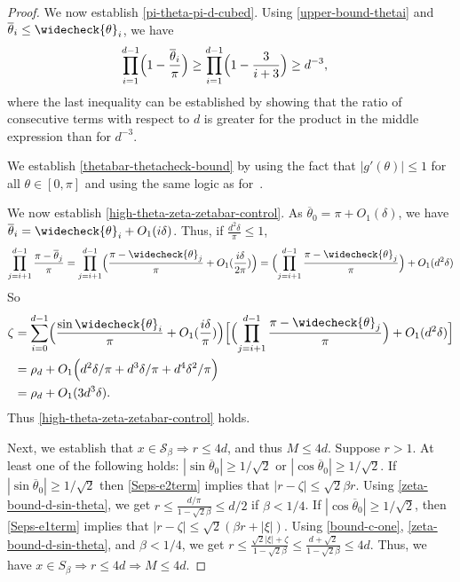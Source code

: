 \documentclass[11pt]{article}
\newcommand{\thetabar}{\overline{\theta}}
\newcommand{\thetacheck}{\widecheck{\theta}}
\newcommand{\zetacheck}{\rho}
\newcommand\setS{\mathcal S}
\begin{document}
\begin{proof}
We now establish \eqref{pi-theta-pi-d-cubed}.  Using \eqref{upper-bound-thetai} and $\thetabar_i \leq \thetacheck_i$, we have
\begin{align*}
\prod_{i=1}^{d-1} \Bigl(1 - \frac{\thetabar_i}{\pi} \Bigr) &\geq \prod_{i=1}^{d-1} \Bigl(1 - \frac{3}{i+3}  \Bigr)
\geq d^{-3},
\end{align*}
where the last inequality can be established by showing that the ratio of consecutive terms with respect to $d$ is greater for the product in the middle expression than for $d^{-3}$.

We establish \eqref{thetabar-thetacheck-bound} by using the fact that $|g'(\theta)| \leq 1$ for all $\theta \in [0, \pi]$ and using the same logic as for~\cite[Eq.~17]{hand_global_2017}.

We now establish \eqref{high-theta-zeta-zetabar-control}.  As $\thetabar_0 = \pi + O_1(\delta)$, we have $\thetabar_i = \thetacheck_i + O_1(i \delta)$.  Thus, if $\frac{d^2 \delta}{\pi}\leq 1$,
\[
\prod_{j=i+1}^{d-1} \frac{\pi - \thetabar_j}{\pi} = \prod_{j=i+1}^{d-1} \Bigl( \frac{\pi - \thetacheck_j}{\pi} + O_1(\frac{i \delta}{2 \pi} ) \Bigr) = \Bigl(\prod_{j=i+1}^{d-1}  \frac{\pi - \thetacheck_j}{\pi} \Bigr)  + O_1(d^2 \delta )
\]
So
\begin{align}
\zeta &= \sum_{i=0}^{d-1} \Bigl( \frac{\sin \thetacheck_i}{\pi} + O_1(\frac{i \delta}{\pi}) \Bigr)  \Bigl[ \Bigl(\prod_{j=i+1}^{d-1} \frac{\pi - \thetacheck_j}{\pi} \Bigr) +O_1(d^2 \delta)  \Bigr] \\
&= \zetacheck_d + O_1 \Bigl( d^2\delta / \pi + d^3 \delta /\pi + d^4 \delta^2/\pi   \Bigr) \\
&= \zetacheck_d + O_1( 3 d^3 \delta).
\end{align}
Thus \eqref{high-theta-zeta-zetabar-control} holds.

Next, we establish that $x \in \setS_\beta \Rightarrow r \leq 4d$, and thus $M \leq 4d$.  Suppose $r > 1$.  At least one of the following holds: $|\sin\thetabar_0| \geq 1/\sqrt{2}$ or $|\cos \thetabar_0| \geq 1/\sqrt{2}$. If $|\sin \thetabar_0| \geq 1/\sqrt{2}$ then  \eqref{Seps-e2term} implies that $|r - \zeta| \leq \sqrt{2} \beta r$.  Using \eqref{zeta-bound-d-sin-theta}, we get $ r \leq \frac{d/\pi}{1 - \sqrt{2} \beta} \leq d/2$ if $\beta < 1/4$.  If $| \cos \thetabar_0| \geq 1/\sqrt{2}$, then \eqref{Seps-e1term} implies that
$|r - \zeta| \leq \sqrt{2} (\beta r + |\xi|)$.   Using \eqref{bound-c-one}, \eqref{zeta-bound-d-sin-theta}, and $\beta<1/4$, we get $r \leq \frac{\sqrt{2} |\xi| +  \zeta}{1 - \sqrt{2}{\beta}} \leq \frac{d + \sqrt{2}}{1 - \sqrt{2} \beta} \leq 4 d$. Thus, we have $x \in S_\beta \Rightarrow r \leq 4d \Rightarrow M \leq 4d$.


\end{proof}
\end{document}
